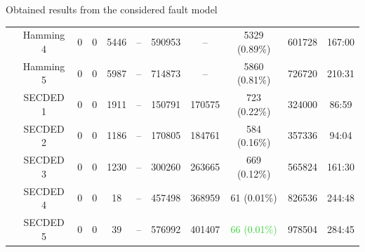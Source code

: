 \begin{frame}{Obtained results from the considered fault model}
\begin{table}[H]
\begin{tabular}{@{}ccccccccccc@{}}
                                                               & Hamming 4     & 0     & 0            & 5446  & --          & \num{590953}                             & --                                      & 5329 {\tiny (0.89\%)}                        & \num{601728} & 167:00                                  \\
                                                               & Hamming 5     & 0     & 0            & 5987  & --          & \num{714873}                             & --                                      & 5860 {\tiny (0.81\%)}                        & \num{726720} & 210:31                                  \\
                                                               & SECDED 1      & 0     & 0            & 1911  & --          & \num{150791}                             & \num{170575}                            & 723 {\tiny (0.22\%)}                         & \num{324000} & 86:59                                   \\
                                                               & SECDED 2      & 0     & 0            & 1186  & --          & \num{170805}                             & \num{184761}                            & 584 {\tiny (0.16\%)}                         & \num{357336} & 94:04                                   \\
                                                               & SECDED 3      & 0     & 0            & 1230  & --          & \num{300260}                             & \num{263665}                            & 669 {\tiny (0.12\%)}                         & \num{565824} & 161:30                                  \\
                                                               & SECDED 4      & 0     & 0            & 18    & --          & \num{457498}                             & \num{368959}                            & 61 {\tiny (0.01\%)}                          & \num{826536} & 244:48                                  \\
                                                               & SECDED 5      & 0     & 0            & 39    & --          & \num{576992}                             & \num{401407}                            & \textcolor{LimeGreen}{66 {\tiny (0.01\%)}}   & \num{978504} & 284:45                                  \\
            \bottomrule
        \end{tabular}
    \end{table}
\end{frame}
